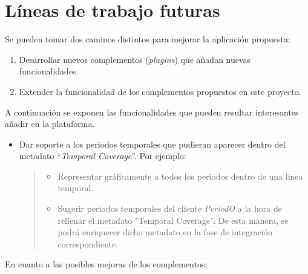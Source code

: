 \section{Líneas de trabajo futuras}

Se pueden tomar dos caminos distintos para mejorar la aplicación
propuesta:

\begin{enumerate}
\def\labelenumi{\arabic{enumi}.}
\tightlist
\item
  Desarrollar nuevos complementos (\emph{plugins}) que añadan nuevas
  funcionalidades.
\item
  Extender la funcionalidad de los complementos propuestos en este
  proyecto.
\end{enumerate}

A continuación se exponen las funcionalidades que pueden resultar
interesantes añadir en la plataforma.

\begin{itemize}
\tightlist
\item
  Dar soporte a los periodos temporales que pudieran aparecer dentro del metadato ``\emph{Temporal Coverage}''. Por ejemplo:
  \begin{quote}
  \begin{itemize}
  \tightlist
  \item
    Representar gráficamente a todos los periodos dentro de una linea temporal.
  \item
    Sugerir periodos temporales del cliente \emph{PeriodO} a la hora de
    rellenar el metadato "Temporal Coverage". De esta manera, se podrá
    enriquecer dicho metadato en la fase de integración correspondiente.
  \end{itemize}
  \end{quote}

\end{itemize}

En cuanto a las posibles mejoras de los complementos:

